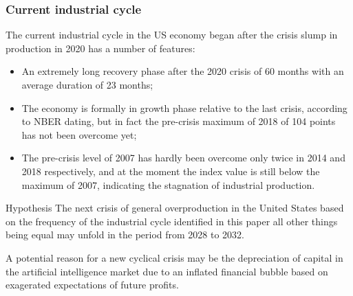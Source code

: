 \begin{frame}
  \frametitle{Current industrial cycle}
  The current industrial cycle in the US economy began after the crisis slump in production in 2020 has a number of features:
  \begin{itemize}
    \item An extremely long recovery phase after the 2020 crisis of 60 months with an average duration of 23 months;
    \item The economy is formally in growth phase relative to the last crisis, according to NBER dating, but in fact the pre-crisis maximum of 2018 of 104 points has not been overcome yet;
    \item The pre-crisis level of 2007 has hardly been overcome only twice in 2014 and 2018 respectively, and at the moment the index value is still below the maximum of 2007, indicating the stagnation of industrial production.
  \end{itemize}

  \begin{alertblock}{Hypothesis}
    The next crisis of general overproduction in the United States based on the frequency of the industrial cycle identified in this paper all other things being equal may unfold in the period from 2028 to 2032.

    \vspace{10pt}

    A potential reason for a new cyclical crisis may be the depreciation of capital in the artificial intelligence market due to an inflated financial bubble based on exagerated expectations of future profits.
  \end{alertblock}
\end{frame}